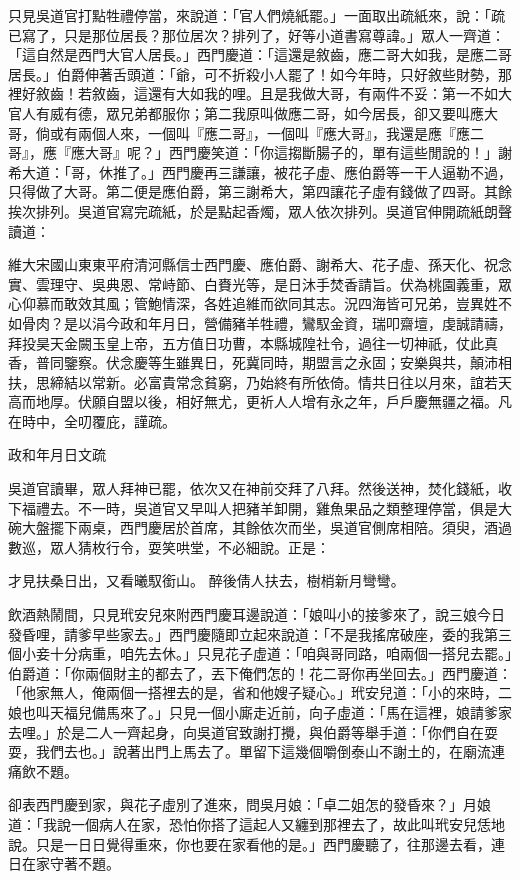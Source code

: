 \begin{showcontents}{}
只見吳道官打點牲禮停當，來說道：「官人們燒紙罷。」一面取出疏紙來，說：「疏已寫了，只是那位居長？那位居次？排列了，好等小道書寫尊諱。」眾人一齊道：「這自然是西門大官人居長。」西門慶道：「這還是敘齒，應二哥大如我，是應二哥居長。」伯爵伸著舌頭道：「爺，可不折殺小人罷了！如今年時，只好敘些財勢，那裡好敘齒！若敘齒，這還有大如我的哩。且是我做大哥，有兩件不妥：第一不如大官人有威有德，眾兄弟都服你；第二我原叫做應二哥，如今居長，卻又要叫應大哥，倘或有兩個人來，一個叫『應二哥』，一個叫『應大哥』，我還是應『應二哥』，應『應大哥』呢？」西門慶笑道：「你這搊斷腸子的，單有這些閒說的！」謝希大道：「哥，休推了。」西門慶再三謙讓，被花子虛、應伯爵等一干人逼勒不過，只得做了大哥。第二便是應伯爵，第三謝希大，第四讓花子虛有錢做了四哥。其餘挨次排列。吳道官寫完疏紙，於是點起香燭，眾人依次排列。吳道官伸開疏紙朗聲讀道：

維大宋國山東東平府清河縣信士西門慶、應伯爵、謝希大、花子虛、孫天化、祝念實、雲理守、吳典恩、常峙節、白賚光等，是日沐手焚香請旨。伏為桃園義重，眾心仰慕而敢效其風；管鮑情深，各姓追維而欲同其志。況四海皆可兄弟，豈異姓不如骨肉？是以涓今政和年月日，營備豬羊牲禮，鸞馭金資，瑞叩齋壇，虔誠請禱，拜投昊天金闕玉皇上帝，五方值日功曹，本縣城隍社令，過往一切神祇，仗此真香，普同鑒察。伏念慶等生雖異日，死冀同時，期盟言之永固；安樂與共，顛沛相扶，思締結以常新。必富貴常念貧窮，乃始終有所依倚。情共日往以月來，誼若天高而地厚。伏願自盟以後，相好無尤，更祈人人增有永之年，戶戶慶無疆之福。凡在時中，全叨覆庇，謹疏。

政和年月日文疏

吳道官讀畢，眾人拜神已罷，依次又在神前交拜了八拜。然後送神，焚化錢紙，收下福禮去。不一時，吳道官又早叫人把豬羊卸開，雞魚果品之類整理停當，俱是大碗大盤擺下兩桌，西門慶居於首席，其餘依次而坐，吳道官側席相陪。須臾，酒過數巡，眾人猜枚行令，耍笑哄堂，不必細說。正是：

才見扶桑日出，又看曦馭銜山。
醉後倩人扶去，樹梢新月彎彎。

飲酒熱鬧間，只見玳安兒來附西門慶耳邊說道：「娘叫小的接爹來了，說三娘今日發昏哩，請爹早些家去。」西門慶隨即立起來說道：「不是我搖席破座，委的我第三個小妾十分病重，咱先去休。」只見花子虛道：「咱與哥同路，咱兩個一搭兒去罷。」伯爵道：「你兩個財主的都去了，丟下俺們怎的！花二哥你再坐回去。」西門慶道：「他家無人，俺兩個一搭裡去的是，省和他嫂子疑心。」玳安兒道：「小的來時，二娘也叫天福兒備馬來了。」只見一個小廝走近前，向子虛道：「馬在這裡，娘請爹家去哩。」於是二人一齊起身，向吳道官致謝打攪，與伯爵等舉手道：「你們自在耍耍，我們去也。」說著出門上馬去了。單留下這幾個嚼倒泰山不謝土的，在廟流連痛飲不題。

卻表西門慶到家，與花子虛別了進來，問吳月娘：「卓二姐怎的發昏來？」月娘道：「我說一個病人在家，恐怕你搭了這起人又纏到那裡去了，故此叫玳安兒恁地說。只是一日日覺得重來，你也要在家看他的是。」西門慶聽了，往那邊去看，連日在家守著不題。


\end{showcontents}
